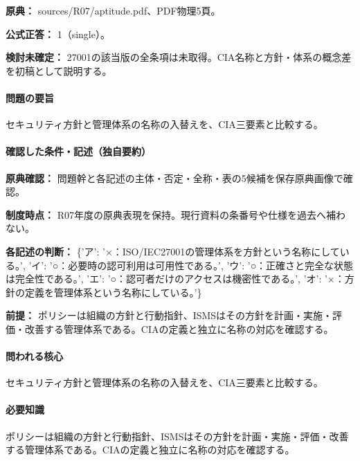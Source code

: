 \noindent\textbf{原典：} sources/R07/aptitude.pdf、PDF物理5頁。

\textbf{公式正答：} 1（single）。

\par\textbf{検討未確定：} 27001の該当版の全条項は未取得。CIA名称と方針・体系の概念差を初稿として説明する。

\paragraph{問題の要旨} セキュリティ方針と管理体系の名称の入替えを、CIA三要素と比較する。

\paragraph{確認した条件・記述（独自要約）}\mbox{}\par

\noindent\textbf{原典確認：} 問題幹と各記述の主体・否定・全称・表の5候補を保存原典画像で確認。\par

\noindent\textbf{制度時点：} R07年度の原典表現を保持。現行資料の条番号や仕様を過去へ補わない。\par

\noindent\textbf{各記述の判断：} \{'ア': '×：ISO/IEC27001の管理体系を方針という名称にしている。', 'イ': '○：必要時の認可利用は可用性である。', 'ウ': '○：正確さと完全な状態は完全性である。', 'エ': '○：認可者だけのアクセスは機密性である。', 'オ': '×：方針の定義を管理体系という名称にしている。'\}\par

\noindent\textbf{前提：} ポリシーは組織の方針と行動指針、ISMSはその方針を計画・実施・評価・改善する管理体系である。CIAの定義と独立に名称の対応を確認する。\par

\paragraph{問われる核心} セキュリティ方針と管理体系の名称の入替えを、CIA三要素と比較する。

\paragraph{必要知識} ポリシーは組織の方針と行動指針、ISMSはその方針を計画・実施・評価・改善する管理体系である。CIAの定義と独立に名称の対応を確認する。

